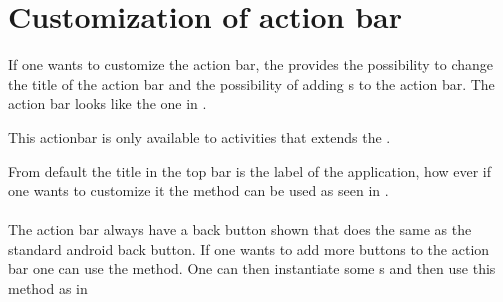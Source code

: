 \chapter{Customization of action bar}
\label{app:customization_of_action_bar}

If one wants to customize the action bar, the  provides the possibility to change the title of the action bar and the possibility of adding s to the action bar. The action bar looks like the one in . 

\begin{note}
    This actionbar is only available to activities that extends the .
\end{note}

\noindent
From default the title in the top bar is the label of the application, how ever if one wants to customize it the  method can be used as seen in .
\\\\
The action bar always have a back button shown that does the same as the standard android back button. If one wants to add more buttons to the action bar one can use the  method. One can then instantiate some s and then use this method as in 


